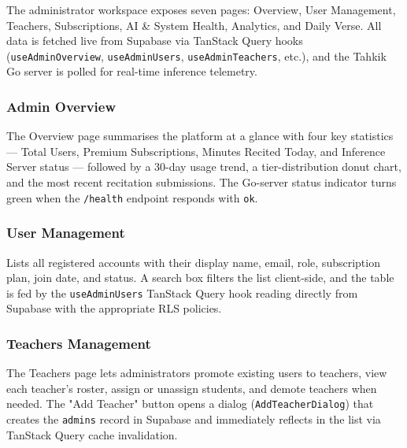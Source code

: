 The administrator workspace exposes seven pages: Overview, User Management, Teachers, Subscriptions, AI \& System Health, Analytics, and Daily Verse. All data is fetched live from Supabase via TanStack Query hooks (\texttt{useAdminOverview}, \texttt{useAdminUsers}, \texttt{useAdminTeachers}, etc.), and the Tahkik Go server is polled for real-time inference telemetry.

\subsubsection{Admin Overview}

The Overview page summarises the platform at a glance with four key statistics — Total Users, Premium Subscriptions, Minutes Recited Today, and Inference Server status — followed by a 30-day usage trend, a tier-distribution donut chart, and the most recent recitation submissions. The Go-server status indicator turns green when the \texttt{/health} endpoint responds with \texttt{ok}.


\subsubsection{User Management}

Lists all registered accounts with their display name, email, role, subscription plan, join date, and status. A search box filters the list client-side, and the table is fed by the \texttt{useAdminUsers} TanStack Query hook reading directly from Supabase with the appropriate RLS policies.


\subsubsection{Teachers Management}

The Teachers page lets administrators promote existing users to teachers, view each teacher's roster, assign or unassign students, and demote teachers when needed. The "Add Teacher" button opens a dialog (\texttt{AddTeacherDialog}) that creates the \texttt{admins} record in Supabase and immediately reflects in the list via TanStack Query cache invalidation.


